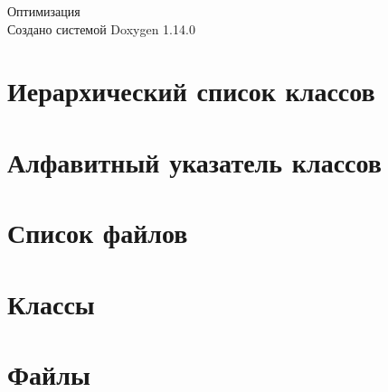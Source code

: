 \documentclass[twoside]{book}
\newcommand{\+}{\discretionary{\mbox{\scriptsize$\hookleftarrow$}}{}{}}
\newcommand{\clearemptydoublepage}{%
    \newpage{\pagestyle{empty}\cleardoublepage}%
  }
\begin{document}
  \raggedbottom
    \hypersetup{pageanchor=false,
                bookmarksnumbered=true,
                pdfencoding=unicode
               }
  \begin{titlepage}
  \vspace*{7cm}
  \begin{center}%
  {\Large Оптимизация}\\
  \vspace*{1cm}
  {\large Создано системой Doxygen 1.14.0}\\
  \end{center}
  \end{titlepage}
  \clearemptydoublepage
  \tableofcontents
  \clearemptydoublepage
  \hypersetup{pageanchor=true}
\chapter{Иерархический список классов}

\chapter{Алфавитный указатель классов}

\chapter{Список файлов}

\chapter{Классы}












\chapter{Файлы}






  \backmatter
  \newpage
  \clearemptydoublepage
  \printindex
\end{document}

